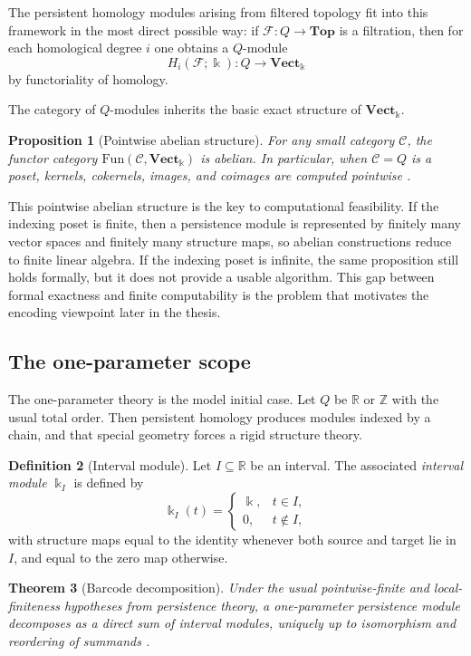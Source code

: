 \documentclass[11pt]{article}
\newcommand{\R}{\mathbb{R}}
\newcommand{\Z}{\mathbb{Z}}
\newcommand{\kk}{\Bbbk}
\newtheorem{theorem}{Theorem}
\newtheorem{proposition}[theorem]{Proposition}
\theoremstyle{definition}
\newtheorem{defn}[theorem]{Definition}
\theoremstyle{remark}
\begin{document}
The persistent homology modules arising from filtered topology fit into this framework in the most direct possible way: if $\mathcal{F} : Q \to \mathbf{Top}$ is a filtration, then for each homological degree $i$ one obtains a $Q$-module
\[
H_i(\mathcal{F};\kk) : Q \longrightarrow \mathbf{Vect}_{\kk}
\]
by functoriality of homology.

The category of $Q$-modules inherits the basic exact structure of $\mathbf{Vect}_{\kk}$.

\begin{proposition}[Pointwise abelian structure]
For any small category $\mathcal{C}$, the functor category $\mathrm{Fun}(\mathcal{C},\mathbf{Vect}_{\kk})$ is abelian. In particular, when $\mathcal{C}=Q$ is a poset, kernels, cokernels, images, and coimages are computed pointwise \cite{Mac98,Wei94}.
\end{proposition}

This pointwise abelian structure is the key to computational feasibility. If the indexing poset is finite, then a persistence module is represented by finitely many vector spaces and finitely many structure maps, so abelian constructions reduce to finite linear algebra. If the indexing poset is infinite, the same proposition still holds formally, but it does not provide a usable algorithm. This gap between formal exactness and finite computability is the problem that motivates the encoding viewpoint later in the thesis.

\subsection{The one-parameter scope}

The one-parameter theory is the model initial case. Let $Q$ be $\R$ or $\Z$ with the usual total order. Then persistent homology produces modules indexed by a chain, and that special geometry forces a rigid structure theory.

\begin{defn}[Interval module]
Let $I \subseteq \R$ be an interval. The associated \emph{interval module} $\kk_I$ is defined by
\[
\kk_I(t)=
\begin{cases}
\kk, & t \in I,\\
0, & t \notin I,
\end{cases}
\]
with structure maps equal to the identity whenever both source and target lie in $I$, and equal to the zero map otherwise.
\end{defn}

\begin{theorem}[Barcode decomposition]
Under the usual pointwise-finite and local-finiteness hypotheses from persistence theory, a one-parameter persistence module decomposes as a direct sum of interval modules, uniquely up to isomorphism and reordering of summands \cite{CB15,Oud15}.
\end{theorem}
\end{document}
